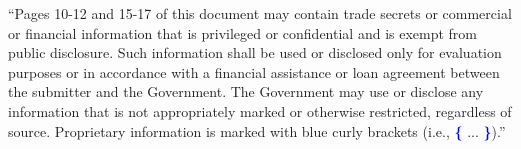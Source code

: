 \documentclass[times,11pt,portrait]{article} %
\date{}
\begin{document}
\maketitle


``Pages 10-12 and 15-17 of this document may contain trade secrets or commercial 
or financial information that is privileged or confidential and is exempt from 
public disclosure. Such information shall be used or disclosed only for 
evaluation purposes or in accordance with a financial assistance or loan 
agreement between the submitter and the Government. The Government may use or 
disclose any information that is not appropriately marked or otherwise 
restricted, regardless of source. Proprietary information is marked with blue 
curly brackets (i.e., \textcolor{blue}{\textbf{\{}} ... 
\textcolor{blue}{\textbf{\}}}).''



\end{document}
